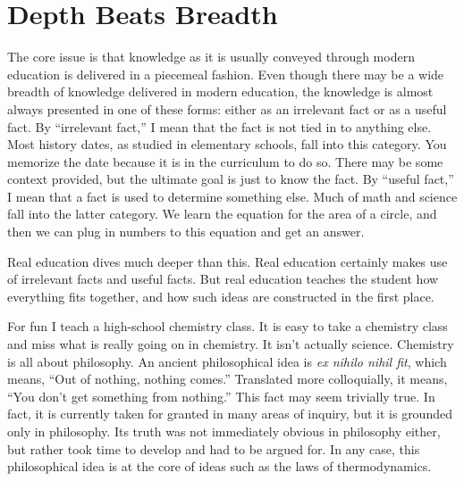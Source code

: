 \documentclass[letterpaper]{article}
\begin{document}
\section{Depth Beats Breadth}
{\color{black}
The core issue is that knowledge as it is usually conveyed through
modern education is delivered in a piecemeal fashion. Even though there
may be a wide breadth of knowledge delivered in modern education, the
knowledge is almost always presented in one of these forms: either as
an irrelevant fact or as a useful fact. By “irrelevant fact,” I mean
that the fact is not tied in to anything else. Most history dates, as
studied in elementary schools, fall into this category. You memorize
the date because it is in the curriculum to do so. There may be some
context provided, but the ultimate goal is just to know the fact. By
“useful fact,” I mean that a fact is used to determine something else.
Much of math and science fall into
\textcolor[rgb]{0.32941177,0.5529412,0.83137256}{the latter category}.
We learn the equation for the area of a circle, and then we can plug in
numbers to this equation and get an answer.}

{\color{black}
Real education \textcolor[rgb]{0.32941177,0.5529412,0.83137256}{dives}
much deeper than this. Real education certainly makes use of irrelevant
facts and useful facts. But real education teaches the student how
\textcolor[rgb]{0.32941177,0.5529412,0.83137256}{everything fits}
together, and how such ideas are constructed in the first place.}

{\color{black}
For fun I teach a high-school chemistry class. It is easy to take a
chemistry class and miss what is really going on in chemistry. It isn’t
actually science. Chemistry is all about philosophy. An ancient
philosophical idea is \textit{ex nihilo nihil fit}, which means, “Out
of nothing, nothing comes.” Translated more colloquially, it means,
“You don’t get something from nothing.”  This fact may seem trivially
true. In fact, it is currently taken for granted in many areas of
inquiry, but it \textcolor[rgb]{0.32941177,0.5529412,0.83137256}{is}
grounded only in philosophy. Its truth was not immediately obvious in
philosophy either, but rather took time to develop and had to be argued
for. In any case, this philosophical idea is at the core of ideas such
as the laws of thermodynamics. }
\end{document}
